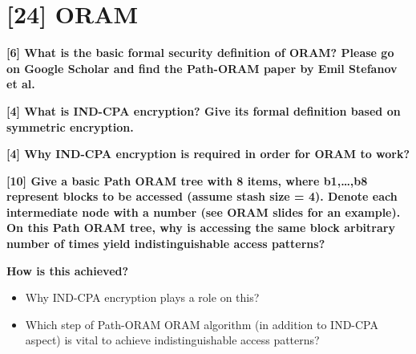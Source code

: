 \documentclass[letterpaper,11pt,notitlepage,fleqn]{article}
\begin{document}
\section{[24] ORAM}

\noindent \textbf{[6] What is the basic formal security definition of ORAM? Please go on Google Scholar and find the Path-ORAM paper by Emil Stefanov et al.} 



\noindent \textbf{[4] What is IND-CPA encryption? Give its formal definition based on symmetric encryption.}



\noindent \textbf{[4] Why IND-CPA encryption is required in order for ORAM to work?}


\noindent \textbf{[10] Give a basic Path ORAM tree with 8 items, where b1,…,b8 represent blocks to be accessed (assume stash size = 4). Denote each intermediate node with a number (see ORAM slides for an example). On this Path ORAM tree, why is accessing the same block arbitrary number of times yield indistinguishable access patterns?} 

\noindent \textbf{How is this achieved?}
\begin{itemize}
    \item Why IND-CPA encryption plays a role on this?
    \item Which  step  of  Path-ORAM  ORAM  algorithm  (in  addition  to  IND-CPA aspect) is vital to achieve indistinguishable access patterns?
\end{itemize}

\medskip


\end{document}
